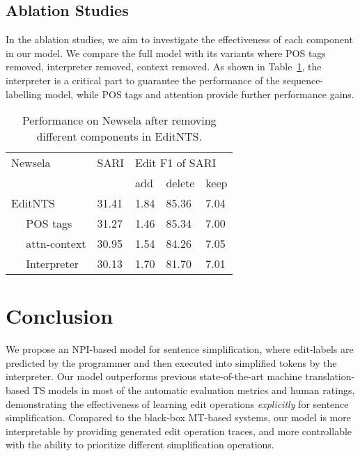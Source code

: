 \documentclass[11pt,a4paper]{article}
\def\editnet{EditNTS}
\begin{document}
\subsection{Ablation Studies} 
\label{sec:ablation}
In the ablation studies, we aim to investigate the effectiveness of each component in our model. We compare the full model with its variants where POS tags removed, interpreter removed, context removed. As shown in Table~\ref{table:ablation1}, the interpreter is a critical part to guarantee the performance of the sequence-labelling model, while POS tags and attention  provide further performance gains. \begin{table}[h] 
 \centering
\small 
\begin{tabular}{l|l|lll}
\toprule
Newsela & SARI & \multicolumn{3}{l}{Edit F1 of SARI}  \\
 &  & add & delete & keep   \\ \midrule
\editnet{} & 31.41 &1.84 & 85.36 & 7.04  \\
~~  POS tags  & 31.27 & 1.46 & 85.34 & 7.00 \\
~~  attn-context & 30.95 & 1.54 & 84.26 & 7.05 \\
~~  Interpreter  & 30.13 & 1.70 & 81.70 & 7.01  \\
\bottomrule
\end{tabular}
\caption{Performance on Newsela after removing different components in \editnet.}
\label{table:ablation1}
\end{table}



\section{Conclusion}




We propose an NPI-based model for sentence simplification, where edit-labels are predicted by the programmer and then executed into simplified tokens by the interpreter. Our model outperforms previous state-of-the-art machine translation-based TS models in most of the automatic evaluation metrics and human ratings, demonstrating the effectiveness of learning edit operations \textit{explicitly} for sentence simplification. Compared to the black-box MT-based systems, our model is more interpretable by providing generated edit operation traces, and more controllable with the ability to prioritize different simplification operations. 
\end{document}
